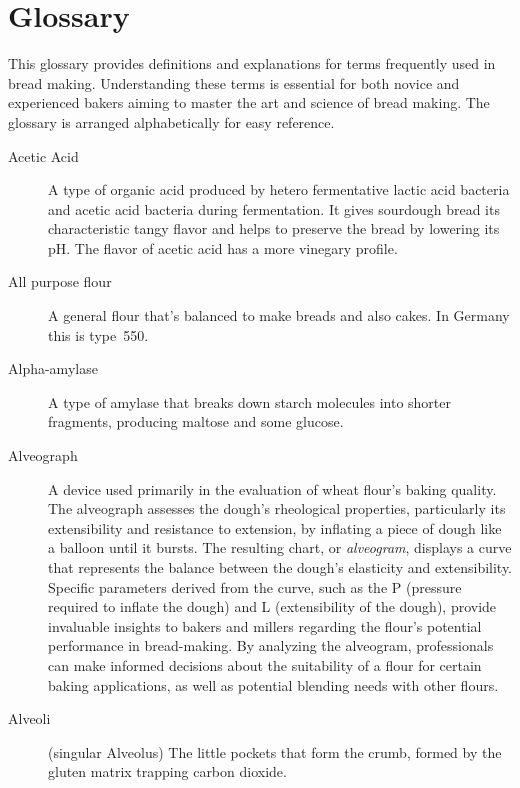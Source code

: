 \chapter{Glossary}%
\label{ch:Glossary}

\begin{quoting}
This glossary provides definitions and explanations for terms frequently
used in bread making. Understanding these terms is essential for both
novice and experienced bakers aiming to master the art and science of
bread making. The glossary is arranged alphabetically for easy reference.
\end{quoting}

\begin{description}

\item[Acetic Acid] A type of organic acid produced by hetero fermentative lactic
acid bacteria and acetic acid bacteria during fermentation. It gives sourdough bread
its characteristic tangy flavor and helps to preserve the bread by lowering its pH.
The flavor of acetic acid has a more vinegary profile.

\item[All purpose flour] A general flour that’s balanced to make breads and also
cakes. In Germany this is type~550.

\item[Alpha-amylase] A type of amylase that breaks down starch molecules into
shorter fragments, producing maltose and some glucose.

\item[Alveograph] A device used primarily in the evaluation of wheat flour's
baking quality. The alveograph assesses the dough's rheological properties,
particularly its extensibility and resistance to extension, by inflating a piece
of dough like a balloon until it bursts. The resulting chart, or \emph{alveogram},
displays a curve that represents the balance between the dough's elasticity and
extensibility. Specific parameters derived from the curve, such as the P (pressure
required to inflate the dough) and L (extensibility of the dough), provide invaluable
insights to bakers and millers regarding the flour's potential performance in
bread-making. By analyzing the alveogram, professionals can make informed decisions
about the suitability of a flour for certain baking applications, as well as
potential blending needs with other flours.

\item[Alveoli] (singular Alveolus) The little pockets that form the crumb,
formed by the gluten matrix trapping carbon dioxide.


\end{description}
